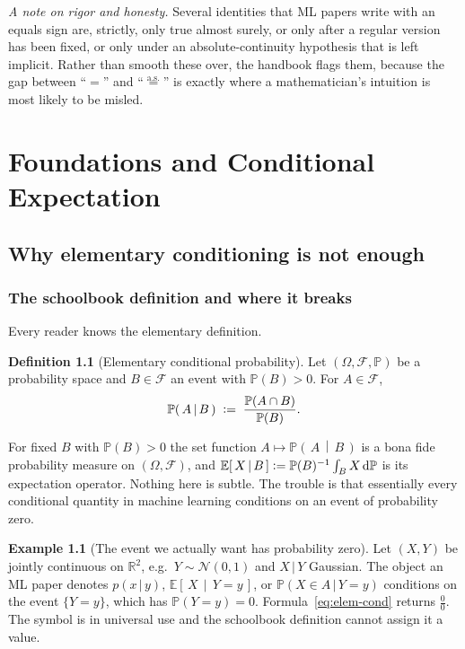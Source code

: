 \documentclass[11pt,oneside]{report}
\theoremstyle{plain}
\theoremstyle{definition}
\newtheorem{definition}[theorem]{Definition}
\newtheorem{example}[theorem]{Example}
\theoremstyle{remark}
\newcommand{\R}{\mathbb{R}}
\newcommand{\Prob}{\mathbb{P}}
\newcommand{\E}{\mathbb{E}}
\newcommand{\dd}{\,\mathrm{d}}
\newcommand{\Fcal}{\mathcal{F}}
\newcommand{\eqas}{\overset{\text{a.s.}}{=}}
\newcommand{\defeq}{\vcentcolon=}
\newcommand{\given}{\,\vert\,}
\newcommand{\cE}[2]{\E\!\left[\,#1 \,\middle|\, #2\,\right]}
\newcommand{\cProb}[2]{\Prob\!\left(\,#1 \,\middle|\, #2\,\right)}
\numberwithin{equation}{chapter}
\begin{document}
\vspace{1em}
\noindent\emph{A note on rigor and honesty.} Several identities that ML
papers write with an equals sign are, strictly, only true almost surely,
or only after a regular version has been fixed, or only under an absolute-continuity
hypothesis that is left implicit. Rather than smooth these over, the
handbook flags them, because the gap between ``$=$'' and ``$\eqas$'' is
exactly where a mathematician's intuition is most likely to be misled.

\cleardoublepage
{}

\part{Foundations and Conditional Expectation}\label{part:foundations}

\chapter{Why elementary conditioning is not enough}\label{ch:why}

\section{The schoolbook definition and where it breaks}

Every reader knows the elementary definition.

\begin{definition}[Elementary conditional probability]\label{def:elem-cond}
Let $(\Omega,\Fcal,\Prob)$ be a probability space and $B\in\Fcal$ an event
with $\Prob(B)>0$. For $A\in\Fcal$,
\begin{equation}\label{eq:elem-cond}
  \cProb{A}{B}\;\defeq\;\frac{\Prob(A\cap B)}{\Prob(B)}.
\end{equation}
\end{definition}

For fixed $B$ with $\Prob(B)>0$ the set function $A\mapsto\cProb{A}{B}$ is
a bona fide probability measure on $(\Omega,\Fcal)$, and
$\cE{X}{B}\defeq\Prob(B)^{-1}\int_B X\dd\Prob$ is its expectation operator.
Nothing here is subtle. The trouble is that essentially every conditional
quantity in machine learning conditions on an event of probability zero.

\begin{example}[The event we actually want has probability zero]
\label{ex:zero}
Let $(X,Y)$ be jointly continuous on $\R^2$, e.g.\ $Y\sim\mathcal N(0,1)$
and $X\given Y$ Gaussian. The object an ML paper denotes $p(x\given y)$,
$\cE{X}{Y=y}$, or $\Prob(X\in A\given Y=y)$ conditions on the event
$\{Y=y\}$, which has $\Prob(Y=y)=0$. Formula~\eqref{eq:elem-cond} returns
$\tfrac{0}{0}$. The symbol is in universal use and the schoolbook
definition cannot assign it a value.
\end{example}
\end{document}
